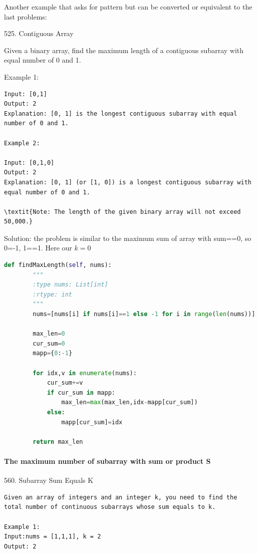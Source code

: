 \documentclass[../specific-algorithms.tex]{subfiles}
\begin{document}
Another example that asks for pattern but can be converted or equivalent to the last problems:

525. Contiguous Array

Given a binary array, find the maximum length of a contiguous subarray with equal number of 0 and 1.

Example 1:
\begin{lstlisting}
Input: [0,1]
Output: 2
Explanation: [0, 1] is the longest contiguous subarray with equal number of 0 and 1.

Example 2:

Input: [0,1,0]
Output: 2
Explanation: [0, 1] (or [1, 0]) is a longest contiguous subarray with equal number of 0 and 1.

\textit{Note: The length of the given binary array will not exceed 50,000.}
\end{lstlisting}

Solution: the problem is similar to the maximum sum of array with sum==0, so 0=-1, 1==1. Here our $k=0$
\begin{lstlisting}[language = Python]
def findMaxLength(self, nums):
        """
        :type nums: List[int]
        :rtype: int
        """
        nums=[nums[i] if nums[i]==1 else -1 for i in range(len(nums))]
        
        max_len=0
        cur_sum=0
        mapp={0:-1}
        
        for idx,v in enumerate(nums):
            cur_sum+=v
            if cur_sum in mapp:
                max_len=max(max_len,idx-mapp[cur_sum])
            else:
                mapp[cur_sum]=idx    
        
        return max_len
\end{lstlisting}

\paragraph{The maximum number of subarray with sum or product S}

560. Subarray Sum Equals K
\begin{lstlisting}
Given an array of integers and an integer k, you need to find the total number of continuous subarrays whose sum equals to k.

Example 1:
Input:nums = [1,1,1], k = 2
Output: 2
\end{lstlisting}
\end{document}
